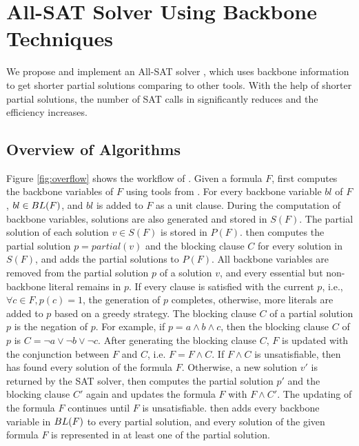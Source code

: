 \section{All-SAT Solver Using Backbone Techniques} \label{sec:meth}
We propose and implement an All-SAT solver \tool, which uses backbone information to get shorter partial solutions comparing to other tools.
With the help of shorter partial solutions, the number of SAT calls in \tool significantly reduces and the efficiency increases.

\subsection{Overview of Algorithms}
Figure \ref{fig:overflow} shows the workflow of \tool.
Given a formula $F$, \tool first computes the backbone variables of $F$ using tools from \cite{bb}.
For every backbone variable $bl$ of $F$, $bl\in {\sc BL}(F)$, and $bl$ is added to $F$ as a unit clause. During the computation of backbone variables, solutions are also generated and stored in $S(F)$. The partial solution of each solution $v\in S(F)$ is stored in $P(F)$.
\tool then computes the partial solution $p=partial(v)$ and the blocking clause $C$ for every solution in $S(F)$, and adds the partial solutions to $P(F)$. 
All backbone variables are removed from the partial solution $p$ of a solution $v$, and every essential but non-backbone literal remains in $p$. If every clause is satisfied with the current $p$, i.e., $\forall c\in F, p(c)=1$, the generation of $p$ completes, otherwise, more literals are added to $p$ based on a greedy strategy.
The blocking clause $C$ of a partial solution $p$ is the negation of $p$. For example, if $p=a\wedge b \wedge c$, then the blocking clause $C$ of $p$ is $C=\neg a \vee \neg b \vee \neg c$.
After generating the blocking clause $C$, $F$ is updated with the conjunction between $F$ and $C$, i.e. $F=F\wedge C$.
If $F\wedge C$ is unsatisfiable, then \tool has found every solution of the formula $F$.
Otherwise, a new solution $v'$ is returned by the SAT solver, \tool then computes the partial solution $p'$ and the blocking clause $C'$ again and updates the formula $F$ with $F\wedge C'$.
The updating of the formula $F$ continues until $F$ is unsatisfiable.
\tool then adds every backbone variable in ${\sc BL}(F)$ to every partial solution, and every solution of the given formula $F$ is represented in at least one of the partial solution.


